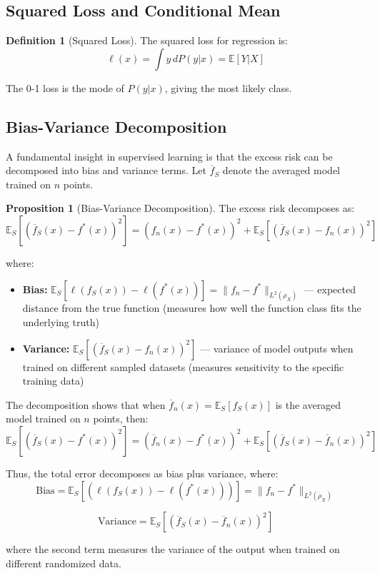 \documentclass[12pt,a4paper]{article}
\theoremstyle{definition}
\newtheorem{definition}{Definition}[section]
\newtheorem{proposition}{Proposition}[section]
\begin{document}
\subsection{Squared Loss and Conditional Mean}

\begin{definition}[Squared Loss]
The squared loss for regression is:
\[
\ell(x) = \int y \, dP(y|x) = \mathbb{E}[Y|X]
\]

The 0-1 loss is the mode of $P(y|x)$, giving the most likely class.
\end{definition}

\subsection{Bias-Variance Decomposition}

A fundamental insight in supervised learning is that the excess risk can be decomposed into bias and variance terms. Let $\overline{f}_S$ denote the averaged model trained on $n$ points.

\begin{proposition}[Bias-Variance Decomposition]
The excess risk decomposes as:
\[
\mathbb{E}_S[(\overline{f}_S(x) - f^*(x))^2] = (f_n(x) - f^*(x))^2 + \mathbb{E}_S[(\overline{f}_S(x) - f_n(x))^2]
\]

where:
\begin{itemize}
    \item \textbf{Bias:} $\mathbb{E}_S[\ell(f_S(x)) - \ell(f^*(x))] = \|f_n - f^*\|_{L^2(\rho_X)}$ — expected distance from the true function (measures how well the function class fits the underlying truth)
    
    \item \textbf{Variance:} $\mathbb{E}_S[(\overline{f}_S(x) - f_n(x))^2]$ — variance of model outputs when trained on different sampled datasets (measures sensitivity to the specific training data)
\end{itemize}

The decomposition shows that when $\overline{f}_n(x) = \mathbb{E}_S[f_S(x)]$ is the averaged model trained on $n$ points, then:
\[
\mathbb{E}_S[(\overline{f}_S(x) - f^*(x))^2] = (\overline{f}_n(x) - f^*(x))^2 + \mathbb{E}_S[(\overline{f}_S(x) - \overline{f}_n(x))^2]
\]

Thus, the total error decomposes as bias plus variance, where:
\[
\text{Bias} = \mathbb{E}_S[(\ell(f_S(x)) - \ell(f^*(x)))] = \|f_n - f^*\|_{L^2(\rho_X)}
\]

\[
\text{Variance} = \mathbb{E}_S[(\overline{f}_S(x) - \overline{f}_n(x))^2]
\]

where the second term measures the variance of the output when trained on different randomized data.
\end{proposition}
\end{document}
